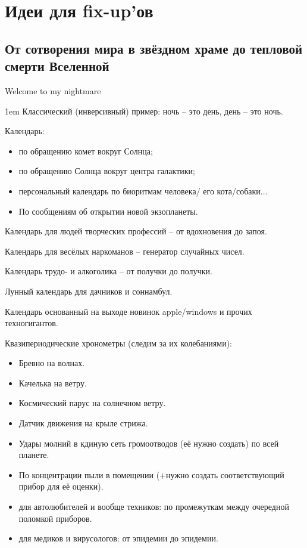 \section{Идеи для fix-up'ов} %
\subsection{От сотворения мира в звёздном храме до тепловой смерти Вселенной}
\begin{epigraph}
    Welcome to my nightmare
\end{epigraph}
\begin{flushleft}\parskip1em
    Классический (инверсивный) пример: ночь -- это день, день -- это ночь.

    Календарь:
    \begin{itemize}
        \item по обращению комет вокруг Солнца;
        \item по обращению Солнца вокруг центра галактики;
        \item персональный календарь по биоритмам человека/ его кота/собаки...
        \item По сообщениям об открытии новой экзопланеты.
    \end{itemize}

    Календарь для людей творческих профессий -- от вдохновения до запоя.

    Календарь для весёлых наркоманов -- генератор случайных чисел.

    Календарь трудо- и алкоголика -- от получки до получки.

    Лунный календарь для дачников и соннамбул.

    Календарь основанный на выходе новинок apple/windows и прочих техногигантов.

    Квазипериодические хронометры (следим за их колебаниями):
    \begin{itemize}
        \item Бревно на волнах.
        \item Качелька на ветру.
        \item Космический парус на солнечном ветру.
        \item Датчик движения на крыле стрижа.
        \item Удары молний в кдиную сеть громоотводов (её нужно создать) по всей планете.
        \item По концентрации пыли в помещении (+нужно создать соответствующий прибор для её оценки).
        \item для автолюбителей и вообще техников: по промежуткам между очередной поломкой приборов.
        \item для медиков и вирусологов: от эпидемии до эпидемии.
    \end{itemize}


\end{flushleft}
